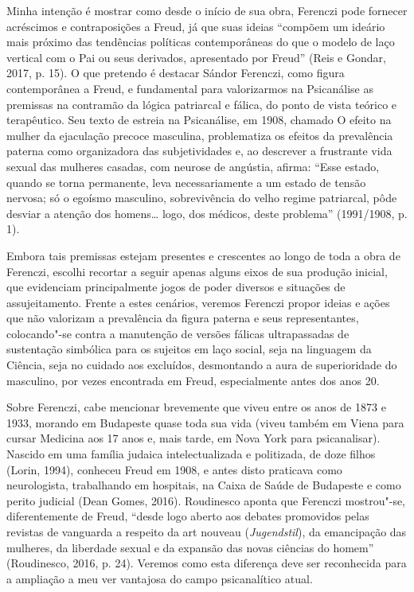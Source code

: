 Minha intenção é mostrar como desde o início de sua obra, Ferenczi pode
fornecer acréscimos e contraposições a Freud, já que suas ideias
``compõem um ideário mais próximo das tendências políticas
contemporâneas do que o modelo de laço vertical com o Pai ou seus
derivados, apresentado por Freud'' (Reis e Gondar, 2017, p. 15). O que
pretendo é destacar Sándor Ferenczi, como figura contemporânea a Freud,
e fundamental para valorizarmos na Psicanálise as premissas na contramão
da lógica patriarcal e fálica, do ponto de vista teórico e terapêutico.
Seu texto de estreia na Psicanálise, em 1908, chamado O efeito na mulher
da ejaculação precoce masculina, problematiza os efeitos da prevalência
paterna como organizadora das subjetividades e, ao descrever a
frustrante vida sexual das mulheres casadas, com neurose de angústia,
afirma: ``Esse estado, quando se torna permanente, leva necessariamente
a um estado de tensão nervosa; só o egoísmo masculino, sobrevivência do
velho regime patriarcal, pôde desviar a atenção dos homens\ldots{} logo, dos
médicos, deste problema'' (1991/1908, p. 1).

Embora tais premissas estejam presentes e crescentes ao longo de toda a
obra de Ferenczi, escolhi recortar a seguir apenas alguns eixos de sua
produção inicial, que evidenciam principalmente jogos de poder diversos
e situações de assujeitamento. Frente a estes cenários, veremos Ferenczi
propor ideias e ações que não valorizam a prevalência da figura paterna
e seus representantes, colocando"-se contra a manutenção de versões
fálicas ultrapassadas de sustentação simbólica para os sujeitos em laço
social, seja na linguagem da Ciência, seja no cuidado aos excluídos,
desmontando a aura de superioridade do masculino, por vezes encontrada
em Freud, especialmente antes dos anos 20.

Sobre Ferenczi, cabe mencionar brevemente que viveu entre os anos de
1873 e 1933, morando em Budapeste quase toda sua vida (viveu também em
Viena para cursar Medicina aos 17 anos e, mais tarde, em Nova York
para psicanalisar). Nascido em uma família judaica intelectualizada e
politizada, de doze filhos (Lorin, 1994), conheceu Freud em 1908, e
antes disto praticava como neurologista, trabalhando em hospitais, na
Caixa de Saúde de Budapeste e como perito judicial (Dean Gomes, 2016).
Roudinesco aponta que Ferenczi mostrou"-se, diferentemente de Freud,
``desde logo aberto aos debates promovidos pelas revistas de vanguarda a
respeito da art nouveau (\emph{Jugendstil}), da emancipação das
mulheres, da liberdade sexual e da expansão das novas ciências do
homem'' (Roudinesco, 2016, p. 24). Veremos como esta diferença deve ser
reconhecida para a ampliação a meu ver vantajosa do campo psicanalítico
atual.

